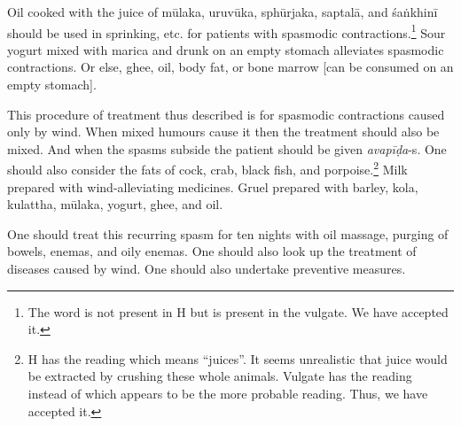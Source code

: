 \begin{translation}
\begin{tt}
        Oil cooked with the juice of \gls{mūlaka}, \gls{uruvūka},
        \gls{sphūrjaka}, \gls{saptalā}, and \gls{śaṅkhinī} should be used in sprinking,
        etc. for patients with spasmodic contractions.\footnote{The word 
            is not present in H but is present in the vulgate. We have accepted it.} Sour
        yogurt mixed with \gls{marica} and drunk on an empty stomach alleviates
        spasmodic contractions. Or else, ghee, oil, body fat, or bone marrow [can be
                consumed on an empty stomach].



        This procedure of treatment thus described is for spasmodic
        contractions caused only by wind. When mixed humours cause it then the
        treatment should also be mixed. And when the spasms subside the patient
        should be given \textit{avapīḍa}-s. One should also consider the fats of cock,
        crab, black fish, and porpoise.\footnote{H has the reading  which
            means \enquote{juices}. It seems unrealistic that juice would be extracted by
            crushing these whole animals. Vulgate has the reading  instead of
             which appears to be the more probable reading. Thus, we have
            accepted it.} Milk prepared with wind-alleviating medicines. Gruel prepared with
        barley, \gls{kola}, \gls{kulattha}, \gls{mūlaka}, yogurt, ghee, and oil.



        One should treat this recurring spasm for ten nights with
        oil massage, purging of bowels, enemas, and oily enemas. One should also look
        up the treatment of diseases caused by wind. One should also undertake
        preventive measures.



        \item[19]


\end{tt}
\end{translation}
